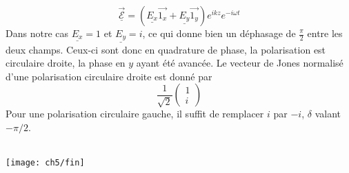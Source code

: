 		\begin{equation}
		\underline{\vec{\mathcal{E}}} = (\underline{E_x}\vec{1_x}+\underline{E_y}\vec{1_y})e^{ikz}e^{-i
		\omega t}
		\end{equation}
		Dans notre cas $\underline{E_x}=1$ et $\underline{E_y} = i$, ce qui donne bien un déphasage de 
		$\frac{\pi}{2}$ entre les deux champs. Ceux-ci sont donc en quadrature de phase, la polarisation 
		est circulaire droite, la phase en $y$ ayant été avancée. Le vecteur de Jones normalisé d'une 
		polarisation circulaire droite est donné par
		\begin{equation}
		\dfrac{1}{\sqrt{2}}\left(\begin{array}{c}
		1\\
		i
		\end{array}\right)
		\end{equation}
		Pour une polarisation circulaire gauche, il suffit de remplacer $i$ par $-i$, $\delta$ valant 
		$-\pi/2$.\\
		\\
		
		
		

			\begin{center}
	\texttt{[image: ch5/fin]}
\end{center}				
	
	
	
	
	
	
	
	
	
	
	
	
	
	
	
	